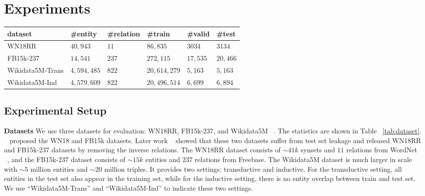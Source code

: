 \documentclass[11pt]{article}
\begin{document}
\section{Experiments}

\begin{table*}[ht]
\centering
\begin{tabular}{@{}l|lllll@{}}
\toprule
dataset          & \#entity & \#relation & \#train & \#valid & \#test \\ \midrule
WN18RR           &   $40,943$  &    $11$    &  $86,835$   &   $3034$   &  $3134$     \\
FB15k-237        &   $14,541$  &    $237$  &  $272,115$  &  $17,535$ & $20,466$ \\
Wikidata5M-Trans &   $4,594,485$   &  $822$   &  $20,614,279$    &  $5,163$  &  $5,163$    \\
Wikidata5M-Ind   &   $4,579,609$   &   $822$ &  $20,496,514$  & $6,699$  &  $6,894$  \\ \bottomrule
\end{tabular}
\caption{Statistics of the datasets used in this paper.
``Wikidata5M-Trans'' and ``Wikidata5M-Ind'' refer to the transductive and inductive settings,
respectively.}
\label{tab:dataset}
\end{table*}

\subsection{Experimental Setup}

\noindent
\textbf{Datasets }
We use three datasets for evaluation:
WN18RR,
FB15k-237,
and Wikidata5M ~\citep{wang2021kepler}.
The statistics are shown in Table ~\ref{tab:dataset}.
~\citet{bordes2013translating} proposed the WN18 and FB15k datasets.
Later work ~\citep{toutanova-etal-2015-representing,dettmers2018convolutional}
showed that these two datasets suffer from test set leakage
and released WN18RR and FB15k-237 datasets by removing the inverse relations.
The WN18RR dataset consists of $\sim41k$ synsets and $11$ relations from WordNet ~\citep{miller1995wordnet},
and the FB15k-237 dataset consists of $\sim15k$ entities and $237$ relations from Freebase.
The Wikidata5M dataset is much larger in scale with $\sim5$ million entities and $\sim20$ million triples.
It provides two settings: transductive and inductive.
For the transductive setting,
all entities in the test set also appear in the training set,
while for the inductive setting,
there is no entity overlap between train and test set.
We use ``Wikidata5M-Trans'' and ``Wikidata5M-Ind'' to indicate these two settings.
\end{document}
